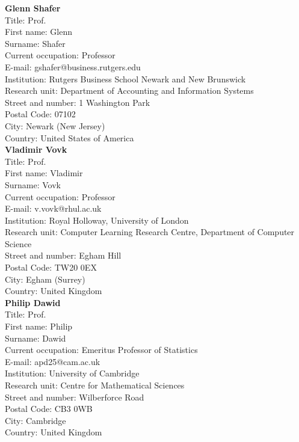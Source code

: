 \documentclass[11pt,dvipsnames,usenames,a4paper]{article}
\begin{document}
{\bf Glenn Shafer}\\
Title: Prof.\\
First name: Glenn\\
Surname:  Shafer \\
Current occupation: Professor\\
E-mail: gshafer@business.rutgers.edu
\\
Institution: Rutgers Business School Newark and New Brunswick\\
Research unit: Department of Accounting and Information Systems\\
Street and number: 1 Washington Park\\
Postal Code: 07102\\
City: Newark (New Jersey)\\
Country: United States of America\\[-7pt]

{\bf Vladimir Vovk}\\
Title: Prof.\\
First name: Vladimir\\
Surname:  Vovk\\
Current occupation: Professor\\
E-mail: v.vovk@rhul.ac.uk\\
Institution: Royal Holloway, University of London\\
Research unit: Computer Learning Research Centre, Department of Computer Science\\
Street and number: Egham Hill\\
Postal Code: TW20 0EX\\
City: Egham (Surrey)\\
Country: United Kingdom\\[-7pt]

{\bf Philip Dawid}\\
Title: Prof.\\
First name: Philip\\
Surname:  Dawid\\
Current occupation: Emeritus Professor of Statistics\\
E-mail:  apd25@cam.ac.uk\\
Institution: University of Cambridge\\
Research unit: Centre for Mathematical Sciences\\
Street and number: Wilberforce Road\\
Postal Code: CB3 0WB\\
City: Cambridge\\
Country: United Kingdom\\[-7pt]
\end{document}
